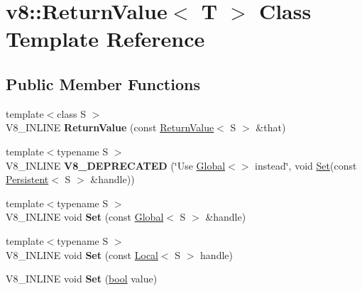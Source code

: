 \hypertarget{classv8_1_1ReturnValue}{}\section{v8\+:\+:Return\+Value$<$ T $>$ Class Template Reference}
\label{classv8_1_1ReturnValue}
\subsection*{Public Member Functions}
\begin{DoxyCompactItemize}
\item 
\mbox{\label{classv8_1_1ReturnValue_a0f1cdf01090e6fc957a0081036a55e6b}} 
{\footnotesize template$<$class S $>$ }\\V8\+\_\+\+I\+N\+L\+I\+NE {\bfseries Return\+Value} (const \mbox{\hyperlink{classv8_1_1ReturnValue}{Return\+Value}}$<$ S $>$ \&that)
\item 
\mbox{\label{classv8_1_1ReturnValue_a0453174f9d6ab50a5eb657e49ce75fdd}} 
{\footnotesize template$<$typename S $>$ }\\V8\+\_\+\+I\+N\+L\+I\+NE {\bfseries V8\+\_\+\+D\+E\+P\+R\+E\+C\+A\+T\+ED} (\char`\"{}Use \mbox{\hyperlink{classv8_1_1Global}{Global}}$<$$>$ instead\char`\"{}, void \mbox{\hyperlink{classv8_1_1Set}{Set}}(const \mbox{\hyperlink{classv8_1_1Persistent}{Persistent}}$<$ S $>$ \&handle))
\item 
\mbox{\label{classv8_1_1ReturnValue_acd7bacd0c0c42de6d7bc904b66fab5d6}} 
{\footnotesize template$<$typename S $>$ }\\V8\+\_\+\+I\+N\+L\+I\+NE void {\bfseries Set} (const \mbox{\hyperlink{classv8_1_1Global}{Global}}$<$ S $>$ \&handle)
\item 
\mbox{\label{classv8_1_1ReturnValue_a865bc8fbded0b17338d7109d8e63be7b}} 
{\footnotesize template$<$typename S $>$ }\\V8\+\_\+\+I\+N\+L\+I\+NE void {\bfseries Set} (const \mbox{\hyperlink{classv8_1_1Local}{Local}}$<$ S $>$ handle)
\item 
\mbox{\label{classv8_1_1ReturnValue_a74d13d68c48028d14934cf076b21fa70}} 
V8\+\_\+\+I\+N\+L\+I\+NE void {\bfseries Set} (\mbox{\hyperlink{classbool}{bool}} value)
$$
\end{DoxyCompactItemize}
